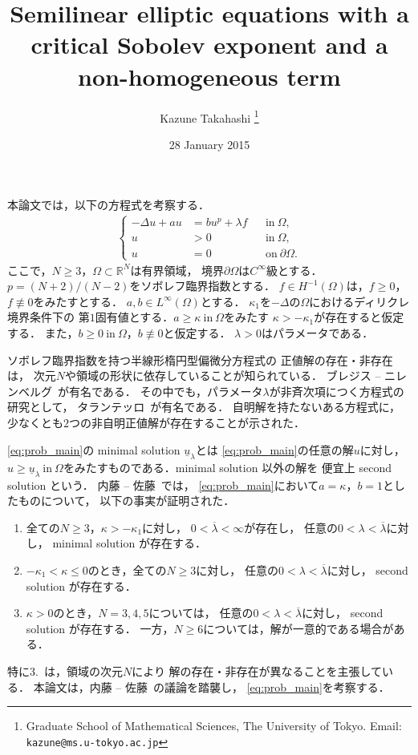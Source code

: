 \documentclass{jsarticle}
\title{Semilinear elliptic equations with a critical Sobolev exponent and a non-homogeneous term}
\author{Kazune Takahashi \thanks{Graduate School of Mathematical
Sciences, The University of Tokyo. Email: \texttt{kazune@ms.u-tokyo.ac.jp}}}
\date{28 January 2015}
\newcommand{\sage}{
\addtolength{\itemindent}{1zw}
\addtolength{\parindent}{1zw}}
\theoremstyle{plain}
\renewcommand{\bar}[1]{\overline{#1}}
\newcommand{\R}{\mathbb{R}}
\newcommand{\tin}{\text{in}~}
\newcommand{\ton}{\text{on}~}
\begin{document}
\maketitle

本論文では，以下の方程式を考察する．
\begin{align}
 \left\{
 \begin{aligned}
  -\Delta u + a u &= b u^p + \lambda f  & &\tin \Omega,  \\
  u &> 0 & &\tin \Omega, \\
  u &= 0 & &\ton \partial\Omega.
 \end{aligned}
 \right. \tag*{$(\spadesuit)_\lambda$} \label{eq:prob_main}
\end{align}
ここで，$N \geq 3$，$\Omega \subset \R^N$は有界領域，
境界$\partial \Omega$は$C^\infty$級とする．
$p = (N+2)/(N-2)$をソボレフ臨界指数とする．
$f \in H^{-1}(\Omega)$は，$f \geq 0$，
$f \not \equiv 0$をみたすとする．
$a, b \in L^\infty(\Omega)$とする．
$\kappa_1$を$-\Delta$の$\Omega$におけるディリクレ境界条件下の
第$1$固有値とする．$a \geq \kappa ~\tin \Omega$をみたす
$\kappa > - \kappa_1$が存在すると仮定する．
また，$b \geq 0 ~\tin \Omega$，$b \not \equiv 0$と仮定する．
$\lambda > 0$はパラメータである．

ソボレフ臨界指数を持つ半線形楕円型偏微分方程式の
正値解の存在・非存在は，
次元$N$や領域の形状に依存していることが知られている．
ブレジス -- ニレンベルグ\cite{MR709644}~が有名である．
その中でも，パラメータ$\lambda$が非斉次項につく方程式の研究として，
タランテッロ\cite{MR1168304}~が有名である．
自明解を持たないある方程式に，
少なくとも$2$つの非自明正値解が存在することが示された．

\ref{eq:prob_main}の minimal solution $\underline{u}_\lambda$とは
\ref{eq:prob_main}の任意の解$u$に対し，$u \geq \underline{u}_\lambda
~\tin \Omega$をみたすものである．minimal solution 以外の解を
便宜上 second solution という．
内藤 -- 佐藤~\cite{MR2886160}では，
\ref{eq:prob_main}において$a = \kappa$，$b = 1$としたものについて，
以下の事実が証明された．
\begin{enumerate}[1.] \sage
 \item 全ての$N \geq 3$，$\kappa > - \kappa_1$に対し，
       $0 < \bar{\lambda} < \infty$が存在し，
       任意の$0 < \lambda < \bar{\lambda}$に対し，
       minimal solution が存在する．
 \item $-\kappa_1 < \kappa \leq 0$のとき，全ての$N \geq 3$に対し，
       任意の$0 < \lambda < \bar{\lambda}$に対し，
       second solution が存在する．
 \item $\kappa > 0$のとき，$N = 3, 4, 5$については，
       任意の$0 < \lambda < \bar{\lambda}$に対し，
       second solution が存在する．
       一方，$N \geq 6$については，解が一意的である場合がある．
\end{enumerate}
特に3.~は，領域の次元$N$により
解の存在・非存在が異なることを主張している．
本論文は，内藤 -- 佐藤~\cite{MR2886160}の議論を踏襲し，
\ref{eq:prob_main}を考察する．
\end{document}

